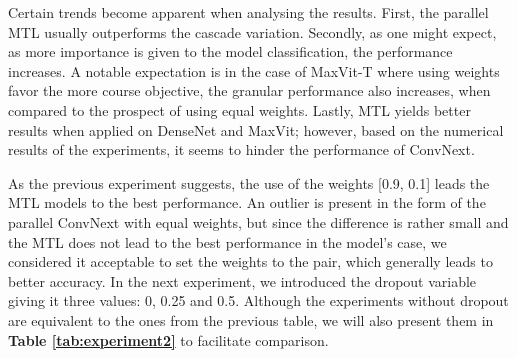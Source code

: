\documentclass[conference]{IEEEtran}
\begin{document}
Certain trends become apparent when analysing the results. First, the parallel MTL usually outperforms the cascade variation. Secondly, as one might expect, as more importance is given to the model classification, the performance increases. A notable expectation is in the case of MaxVit-T where using weights favor the more course objective, the granular performance also increases, when compared to the prospect of using equal weights. Lastly, MTL yields better results when applied on DenseNet and MaxVit; however, based on the numerical results of the experiments, it seems to hinder the performance of ConvNext.


As the previous experiment suggests, the use of the weights [0.9, 0.1] leads the MTL models to the best performance. An outlier is present in the form of the parallel ConvNext with equal weights, but since the difference is rather small and the MTL does not lead to the best performance in the model's case, we considered it acceptable to set the weights to the pair, which generally leads to better accuracy. In the next experiment, we introduced the dropout variable giving it three values: 0, 0.25 and 0.5. Although the experiments without dropout are equivalent to the ones from the previous table, we will also present them in \textbf{Table \ref{tab:experiment2}} to facilitate comparison.
\end{document}
